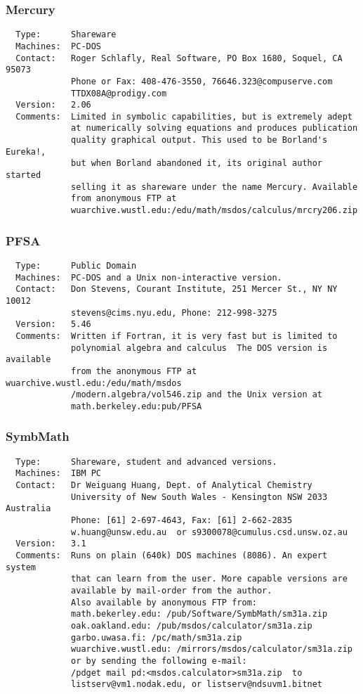 \documentclass[twoside,11pt]{article}
\begin{document}
\subsubsection{Mercury}
\begin{verbatim}
  Type:      Shareware
  Machines:  PC-DOS
  Contact:   Roger Schlafly, Real Software, PO Box 1680, Soquel, CA 95073
             Phone or Fax: 408-476-3550, 76646.323@compuserve.com
             TTDX08A@prodigy.com
  Version:   2.06
  Comments:  Limited in symbolic capabilities, but is extremely adept
             at numerically solving equations and produces publication
             quality graphical output. This used to be Borland's Eureka!,
             but when Borland abandoned it, its original author started
             selling it as shareware under the name Mercury. Available
             from anonymous FTP at
             wuarchive.wustl.edu:/edu/math/msdos/calculus/mrcry206.zip
\end{verbatim}

\subsubsection{PFSA}
\begin{verbatim}
  Type:      Public Domain
  Machines:  PC-DOS and a Unix non-interactive version.
  Contact:   Don Stevens, Courant Institute, 251 Mercer St., NY NY 10012
             stevens@cims.nyu.edu, Phone: 212-998-3275
  Version:   5.46
  Comments:  Written if Fortran, it is very fast but is limited to
             polynomial algebra and calculus  The DOS version is available
             from the anonymous FTP at wuarchive.wustl.edu:/edu/math/msdos
             /modern.algebra/vol546.zip and the Unix version at
             math.berkeley.edu:pub/PFSA
\end{verbatim}

\subsubsection{SymbMath}
\begin{verbatim}
  Type:      Shareware, student and advanced versions.
  Machines:  IBM PC
  Contact:   Dr Weiguang Huang, Dept. of Analytical Chemistry
             University of New South Wales - Kensington NSW 2033 Australia
             Phone: [61] 2-697-4643, Fax: [61] 2-662-2835
             w.huang@unsw.edu.au  or s9300078@cumulus.csd.unsw.oz.au
  Version:   3.1
  Comments:  Runs on plain (640k) DOS machines (8086). An expert system
             that can learn from the user. More capable versions are
             available by mail-order from the author.
             Also available by anonymous FTP from:
             math.bekerley.edu: /pub/Software/SymbMath/sm31a.zip
             oak.oakland.edu: /pub/msdos/calculator/sm31a.zip
             garbo.uwasa.fi: /pc/math/sm31a.zip
             wuarchive.wustl.edu: /mirrors/msdos/calculator/sm31a.zip
             or by sending the following e-mail:
             /pdget mail pd:<msdos.calculator>sm31a.zip  to
             listserv@vm1.nodak.edu, or listserv@ndsuvm1.bitnet
\end{verbatim}
\end{document}
